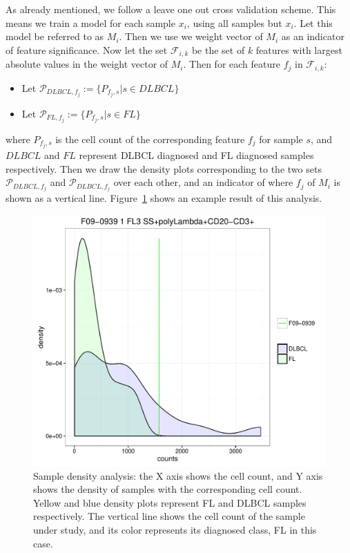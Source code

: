 As already mentioned, we follow a leave one out cross validation scheme. This means we train a model for each sample $x_i$, using all samples but $x_i$. Let this model be referred to as $M_i$. Then we use we weight vector of $M_i$ as an indicator of feature significance. Now let the set $\mathcal{F}_{i,k}$ be the set of $k$ features with largest absolute values in the weight vector of $M_i$. Then for each feature $f_j$ in $\mathcal{F}_{i,k}$:
\begin{itemize}
\item Let $\mathcal{P}_{DLBCL, f_j} := \{P_{f_j, s} | s \in DLBCL\}$
\item Let $\mathcal{P}_{FL, f_j} := \{P_{f_j, s} | s \in FL\}$
\end{itemize}

where $P_{f_j, s}$ is the cell count of the corresponding feature $f_j$ for sample $s$, and $DLBCL$ and $FL$ represent DLBCL diagnosed and FL diagnosed samples respectively. Then we draw the density plots corresponding to the two sets $\mathcal{P}_{DLBCL, f_j}$ and $\mathcal{P}_{DLBCL, f_j}$ over each other, and an indicator of where $f_j$ of $M_i$ is shown as a vertical line. Figure~\ref{fig:fcs-qa-sample-density} shows an example result of this analysis.

\begin{figure}[!ht]
  \centering
  \includegraphics[width=.6\textwidth]{figs/fcs-qa/density-analysis/F09-0939_tube1_0202000120_density}
  \caption{Sample density analysis: the X axis shows the cell count, and Y axis shows the density of samples with the corresponding cell count. Yellow and blue density plots represent FL and DLBCL samples respectively. The vertical line shows the cell count of the sample under study, and its color represents its diagnosed class, FL in this case.}
  \label{fig:fcs-qa-sample-density}
\end{figure}

